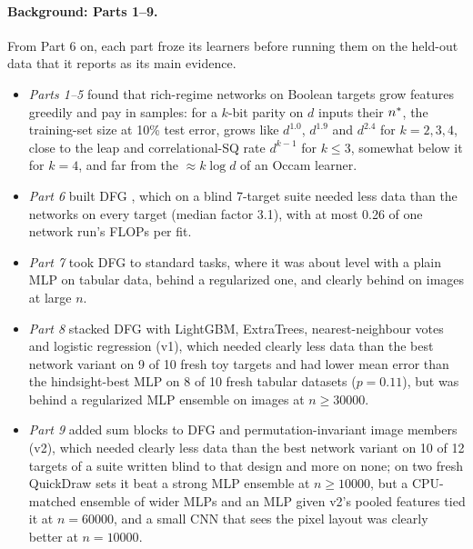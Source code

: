 \paragraph{Background: Parts 1--9.} From Part 6 on, each part froze its learners before running them on the held-out data that it reports as its main evidence.
\begin{itemize}
\item \emph{Parts 1--5} \cite{gdcircuit2026} found that rich-regime networks on Boolean targets grow features greedily and pay in samples: for a $k$-bit parity on $d$ inputs their $n^{*}$, the training-set size at 10\% test error, grows like $d^{1.0}$, $d^{1.9}$ and $d^{2.4}$ for $k=2,3,4$, close to the leap and correlational-SQ rate $d^{k-1}$ \cite{abbe2022msp,abbe2023leap} for $k\le3$, somewhat below it for $k=4$, and far from the $\approx k\log d$ of an Occam learner.
\item \emph{Part 6} built DFG \cite{discretelearners2026}, which on a blind 7-target suite needed less data than the networks on every target (median factor 3.1), with at most 0.26 of one network run's FLOPs per fit.
\item \emph{Part 7} took DFG to standard tasks, where it was about level with a plain MLP on tabular data, behind a regularized one, and clearly behind on images at large $n$.
\item \emph{Part 8} stacked DFG with LightGBM, ExtraTrees, nearest-neighbour votes and logistic regression (v1), which needed clearly less data than the best network variant on 9 of 10 fresh toy targets and had lower mean error than the hindsight-best MLP on 8 of 10 fresh tabular datasets ($p=0.11$), but was behind a regularized MLP ensemble on images at $n\ge30000$.
\item \emph{Part 9} added sum blocks to DFG and permutation-invariant image members (v2), which needed clearly less data than the best network variant on 10 of 12 targets of a suite written blind to that design and more on none; on two fresh QuickDraw sets it beat a strong MLP ensemble at $n\ge10000$, but a CPU-matched ensemble of wider MLPs and an MLP given v2's pooled features tied it at $n=60000$, and a small CNN that sees the pixel layout was clearly better at $n=10000$.
\end{itemize}

